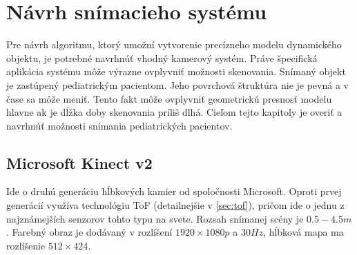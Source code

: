 
\chapter{Návrh snímacieho systému} 
\label{kap:návrh systému}
\pagestyle{fancy}
\fancyhf{}
\fancyfoot[CE,CO]{\thepage}
\renewcommand{\footrulewidth}{1pt}

Pre návrh algoritmu, ktorý umožní vytvorenie precízneho modelu dynamického objektu, je potrebné navrhnúť vhodný kamerový systém. Práve špecifická aplikácia systému môže výrazne ovplyvniť možnosti skenovania. Snímaný objekt je zastúpený pediatrickým pacientom. Jeho povrchová štruktúra nie je pevná a v čase sa môže meniť. Tento fakt môže ovplyvniť geometrickú presnosť modelu hlavne ak je dĺžka doby skenovania príliš dlhá. Cieľom tejto kapitoly je overiť a navrhnúť možnosti snímania pediatrických pacientov.


%
%
%

\section{Microsoft Kinect v2}

Ide o druhú generáciu hĺbkových kamier od spoločnosti Microsoft. Oproti prvej generácií využíva technológiu ToF (detailnejšie v \ref{sec:tof}), pričom ide o jednu z najznámejších senzorov tohto typu na svete. Rozsah snímanej scény je $0.5-4.5 m$. Farebný obraz je dodávaný v rozlíšení $1920\times1080p$ a $30Hz$, hĺbková mapa ma rozlíšenie $512\times424$.

